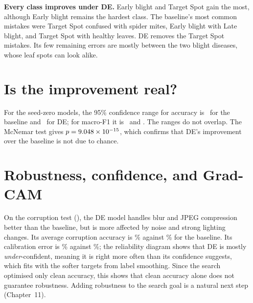 



\textbf{Every class improves under DE.} Early blight and Target Spot gain the most, although Early blight remains the hardest class. The baseline's most common mistakes were Target Spot confused with spider mites, Early blight with Late blight, and Target Spot with healthy leaves. DE removes the Target Spot mistakes. Its few remaining errors are mostly between the two blight diseases, whose leaf spots can look alike.

\section{Is the improvement real?}
For the seed-zero models, the 95\% confidence range for accuracy is \BaseAccCI\ for the baseline and \DEAccCI\ for DE; for macro-F1 it is \BaseFoneCI\ and \DEFoneCI. The ranges do not overlap. The McNemar test gives $p=\num{9.048e-15}$, which confirms that DE's improvement over the baseline is not due to chance.


\section{Robustness, confidence, and Grad-CAM}
On the corruption test (), the DE model handles blur and JPEG compression better than the baseline, but is more affected by noise and strong lighting changes. Its average corruption accuracy is \DERobustAcc\% against \BaseRobustAcc\% for the baseline. Its calibration error is \DEECE\% against \BaseECE\%; the reliability diagram shows that DE is mostly \emph{under}-confident, meaning it is right more often than its confidence suggests, which fits with the softer targets from label smoothing. Since the search optimised only clean accuracy, this shows that clean accuracy alone does not guarantee robustness. Adding robustness to the search goal is a natural next step (Chapter~11).


